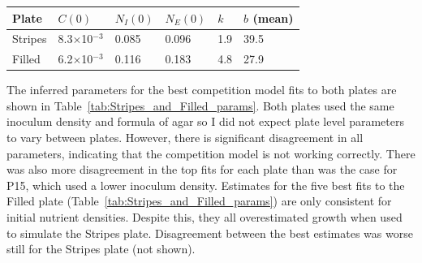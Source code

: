 \begin{multicols}{2}
\begin{center}
  \begin{tabular}{l l l l l l}
    \hline
    Plate     & \(C(0)\)                   & \(N_{I}(0)\) & \(N_{E}(0)\) & \(k\) & \(b\) (mean)\\
    \hline
    Stripes   & 8.3\(\times\)10\(^{-3}\)   & 0.085      & 0.096       & 1.9  & 39.5\\
    Filled    & 6.2\(\times\)10\(^{-3}\)   & 0.116      & 0.183       & 4.8  & 27.9\\
    \hline
  \end{tabular}
  \label{tab:Stripes_and_Filled_params}
\end{center}

The inferred parameters for the best competition model fits to both
plates are shown in Table~\ref{tab:Stripes_and_Filled_params}. Both
plates used the same inoculum density and formula of agar so I did not
expect plate level parameters to vary between plates. However, there
is significant disagreement in all parameters, indicating that the
competition model is not working correctly. There was also more
disagreement in the top fits for each plate than was the case for P15,
which used a lower inoculum density. Estimates for the five best fits
to the Filled plate (Table~\ref{tab:Stripes_and_Filled_params}) are
only consistent for initial nutrient densities. Despite this, they all
overestimated growth when used to simulate the Stripes
plate. Disagreement between the best estimates was worse still for the
Stripes plate (not shown).


\end{multicols}
